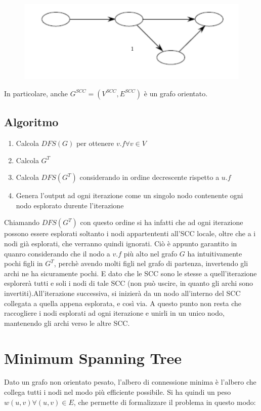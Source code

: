 \documentclass{article}
\begin{document}
\begin{figure}[h]
\centering
\includegraphics[width=1\linewidth]
{"./graph3.png"}
\label{graph}
\end{figure}
 In particolare, anche $G^{SCC} = (V^{SCC}, E^{SCC})$ è un grafo orientato.
 \subsection{Algoritmo}
 \begin{enumerate}
 	\item Calcola $DFS(G)$ per ottenere $v.f \forall v 	\in V$
 	\item Calcola $G^T$
 	\item Calcola $DFS(G^T)$ considerando in ordine decrescente rispetto a $u.f$
 	\item Genera l'output ad ogni iterazione come un singolo nodo contenente ogni nodo esplorato durente l'iterazione
 \end{enumerate}
Chiamando $DFS(G^T)$ con questo ordine si ha infatti che ad ogni iterazione possono essere esplorati soltanto i nodi appartententi all'SCC locale, oltre che a i nodi già esplorati, che verranno quindi ignorati. Ciò è appunto garantito in quanro considerando che il nodo a $v.f$ più alto nel grafo $G$ ha intuitivamente pochi figli in $G^T$, perchè avendo molti figli nel grafo di partenza, invertendo gli archi ne ha sicuramente pochi. E dato che le SCC sono le stesse a quell'iterazione esplorerà tutti e soli i nodi di tale SCC (non può uscire, in quanto gli archi sono invertiti).All'iterazione successiva, si inizierà da un nodo all'interno del SCC collegata a quella appena esplorata, e così via.
A questo punto non resta che raccogliere i nodi esplorati ad ogni iterazione e unirli in un unico nodo, mantenendo gli archi verso le altre SCC.
\section{Minimum Spanning Tree}
Dato un grafo non orientato pesato,  l'albero di connessione minima è l'albero che collega tutti i nodi nel modo più efficiente possibile. \newline Si ha quindi un peso $w(u, v) \forall (u, v) \in E$, che permette di formalizzare il problema in questo modo: 
\end{document}
